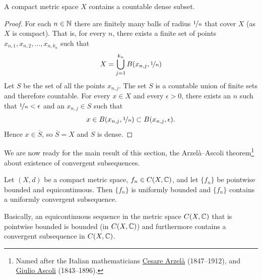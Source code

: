 \begin{prop}
A compact metric space $X$ contains a countable dense subset.
\end{prop}

\begin{proof}
For each $n \in {\mathbb{N}}$ there are finitely many
balls of radius $\nicefrac{1}{n}$ that cover $X$ (as $X$ is compact). That is,
for every $n$, there exists
a finite set of points $x_{n,1},x_{n,2},\ldots,x_{n,k_n}$ such that
\begin{equation*}
X= \bigcup_{j=1}^{k_n} B(x_{n,j},\nicefrac{1}{n})
\end{equation*}
Let $S$ be the set of all the points $x_{n,j}$.  The set $S$ is a countable
union of finite sets and therefore countable.  For every $x \in X$
and every $\epsilon > 0$, there exists an $n$ such that
$\nicefrac{1}{n} < \epsilon$ and an $x_{n,j} \in S$ such that
\begin{equation*}
x \in B(x_{n,j},\nicefrac{1}{n}) \subset B(x_{n,j},\epsilon) .
\end{equation*}
Hence $x \in \overline{S}$, so $\overline{S} = X$ and $S$ is dense.
\end{proof}

We are now ready for the main result of this section,
the Arzel\`a--Ascoli theorem\footnote{%
Named after the Italian mathematicians
\href{http://en.wikipedia.org/wiki/Cesare_Arzel\%C3\%A0}{Cesare Arzel\`a}
(1847--1912), and
\href{http://en.wikipedia.org/wiki/Giulio_Ascoli}{Giulio Ascoli}
(1843--1896).} about existence of convergent subsequences.

\begin{thm}
\label{thm:arzelaascoli}
Let $(X,d)$ be a compact metric space, $f_n \in C(X,{\mathbb{C}})$, and let $\{ f_n \}$
be pointwise bounded and equicontinuous.  Then
$\{f_n\}$ is uniformly bounded and $\{ f_n \}$ contains a uniformly
convergent subsequence.
\end{thm}

Basically, an equicontinuous sequence in the metric space
$C(X,{\mathbb{C}})$ that is pointwise bounded
is bounded (in $C(X,{\mathbb{C}})$) and furthermore contains a convergent
subsequence in $C(X,{\mathbb{C}})$.


